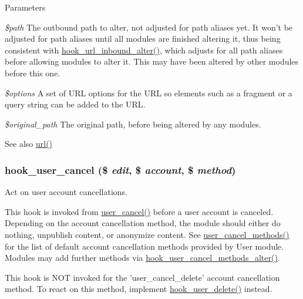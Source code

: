 \begin{DoxyParams}{Parameters}
\item[{\em \$path}]The outbound path to alter, not adjusted for path aliases yet. It won't be adjusted for path aliases until all modules are finished altering it, thus being consistent with \hyperlink{group__hooks_ga32da9c3f1486c293818f30fa4037e33f}{hook\_\-url\_\-inbound\_\-alter()}, which adjusts for all path aliases before allowing modules to alter it. This may have been altered by other modules before this one. \item[{\em \$options}]A set of URL options for the URL so elements such as a fragment or a query string can be added to the URL. \item[{\em \$original\_\-path}]The original path, before being altered by any modules.\end{DoxyParams}
\begin{DoxySeeAlso}{See also}
\hyperlink{common_8inc_a43b2a0594431556db49df980801d8807}{url()} 
\end{DoxySeeAlso}
\hypertarget{group__hooks_gad6223ddd2f0f52c331df8a3315d9a41e}{
\subsubsection[{hook\_\-user\_\-cancel}]{\setlength{\rightskip}{0pt plus 5cm}hook\_\-user\_\-cancel (\$ {\em edit}, \/  \$ {\em account}, \/  \$ {\em method})}}
\label{group__hooks_gad6223ddd2f0f52c331df8a3315d9a41e}
Act on user account cancellations.

This hook is invoked from \hyperlink{user_8module_af6ef747e6353edaecc43f55dc85eff9e}{user\_\-cancel()} before a user account is canceled. Depending on the account cancellation method, the module should either do nothing, unpublish content, or anonymize content. See \hyperlink{user_8pages_8inc_a11f0201b4e77086622c55fd3ed13bb93}{user\_\-cancel\_\-methods()} for the list of default account cancellation methods provided by User module. Modules may add further methods via \hyperlink{group__hooks_gadbac37235bb01361bf8b3d375ea417a5}{hook\_\-user\_\-cancel\_\-methods\_\-alter()}.

This hook is NOT invoked for the 'user\_\-cancel\_\-delete' account cancellation method. To react on this method, implement \hyperlink{group__hooks_ga2c0755857e486e8a770b44b496da9929}{hook\_\-user\_\-delete()} instead.

